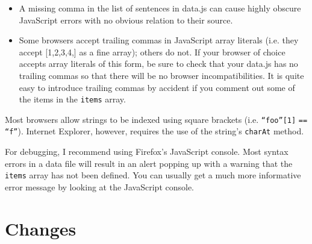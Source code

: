 \documentclass[11pt,letterpaper]{article}
\begin{document}
\begin{itemize}

\item
 A missing comma in the list of sentences in data.js can cause highly obscure JavaScript errors with no obvious relation to their source.
\item
 Some browsers accept trailing commas in JavaScript array literals (i.e. they accept {[}1,2,3,4,{]} as a fine array); others do not. If your browser of choice accepts array literals of this form, be sure to check that your data.js has no trailing commas so that there will be no browser incompatibilities. It is quite easy to introduce trailing commas by accident if you comment out some of the items in the \texttt{items} array.
\end{itemize}
Most browsers allow strings to be indexed using square brackets (i.e. \texttt{``foo''}\texttt{{[}1{]}}
\texttt{== ``f''}). Internet Explorer, however, requires the use of the string's \texttt{charAt}
method.

For debugging, I recommend using Firefox's JavaScript console. Most syntax
errors in a data file will result in an alert popping up with a warning that the
\texttt{items} array has not been defined. You can usually get a much more informative
error message by looking at the JavaScript console.

\section{Changes}
\end{document}
